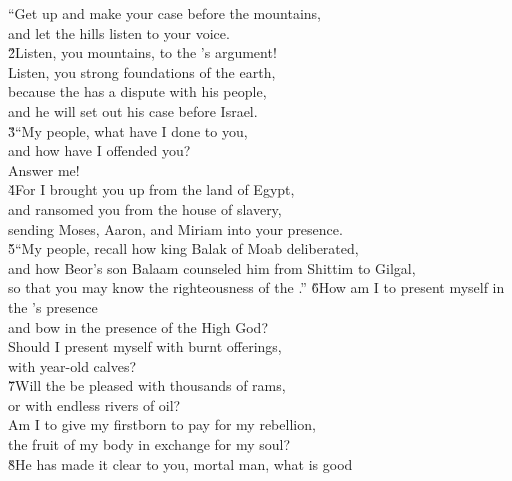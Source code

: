 \begin{poetry}
\poemll    ``Get up and make your case before the mountains, \\
\poemlll       and let the hills listen to your voice. \\
\poeml \v{2}Listen, you mountains, to the 's argument! \\
\poemll    Listen, you strong foundations of the earth, \\
\poeml because the  has a dispute with his people, \\
\poemll    and he will set out his case before Israel. \\
\poeml \v{3}``My people, what have I done to you, \\
\poemll    and how have I offended you? \\
\poemlll       Answer me! \\
\poeml \v{4}For I brought you up from the land of Egypt, \\
\poemll    and ransomed you from the house of slavery, \\
\poemlll       sending Moses, Aaron, and Miriam into your presence. \\
\poeml \v{5}``My people, recall how king Balak of Moab deliberated, \\
\poemll    and how Beor's son Balaam counseled him from Shittim to Gilgal, \\
\poemlll       so that you may know the righteousness of the .''
\poeml \v{6}How am I to present myself in the 's presence \\
\poemll    and bow in the presence of the High God? \\
\poeml Should I present myself with burnt offerings, \\
\poemll    with year-old calves? \\
\poeml \v{7}Will the  be pleased with thousands of rams, \\
\poemll    or with endless rivers of oil? \\
\poeml Am I to give my firstborn to pay for my rebellion, \\
\poemll    the fruit of my body in exchange for my soul? \\
\poeml \v{8}He has made it clear to you, mortal man, what is good \\

\end{poetry}
